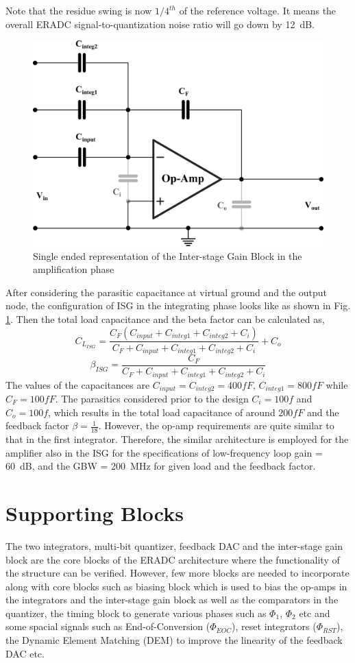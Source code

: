 Note that the residue swing is now $1/4^{th}$ of the reference voltage. It means the overall ERADC signal-to-quantization noise ratio will go down by 12~dB.
%
\begin{figure}[h!]
    \centering
    \includegraphics[width=0.6\columnwidth]{Chap05/Figures/ISG_opamp.png}
    \caption{Single ended representation of the Inter-stage Gain Block in the amplification phase}
    \label{fig:ISG_ampl}
\end{figure}
%

After considering the parasitic capacitance at virtual ground and the output node, the configuration of ISG in the integrating phase looks like as shown in Fig. \ref{fig:ISG_ampl}. Then the total load capacitance and the beta factor can be calculated as,
%
\begin{equation}
    C_{L_{ISG}}=\frac{C_{F}(C_{input}+C_{integ1}+C_{integ2}+C_i)}{C_{F}+C_{input}+C_{integ1}+C_{integ2}+C_i}+C_o
\end{equation}
%
%
\begin{equation}
    \beta_{ISG} = \frac{C_{F}}{C_{F}+C_{input}+C_{integ1}+C_{integ2}+C_i}
\end{equation}
%
The values of the capacitances are $C_{input}=C_{integ2}=400 fF$, $C_{integ1}=800 fF$ while $C_{F}=100 fF$. The parasitics considered prior to the design $C_i=100f$
and $C_o=100f$, which results in the total load capacitance of around $200 fF$ and the feedback factor $\beta = \frac{1}{18}$. However, the op-amp requirements are quite similar to that in the first integrator. Therefore, the similar architecture is employed for the amplifier also in the ISG for the specifications of low-frequency loop gain = 60~dB, and the GBW = 200~MHz for given load and the feedback factor.


\section{Supporting Blocks}
The two integrators, multi-bit quantizer, feedback DAC and the inter-stage gain block are the core blocks of the ERADC architecture where the functionality of the structure can be verified. However, few more blocks are needed to incorporate along with core blocks such as biasing block which is used to bias the op-amps in the integrators and the inter-stage gain block as well as the comparators in the quantizer, the timing block to generate various phases such as $\Phi_1$, $\Phi_2$ etc and some spacial signals such as End-of-Conversion ($\Phi_{EOC}$), reset integrators ($\Phi_{RST}$), the Dynamic Element Matching (DEM) to improve the linearity of the feedback DAC etc.

